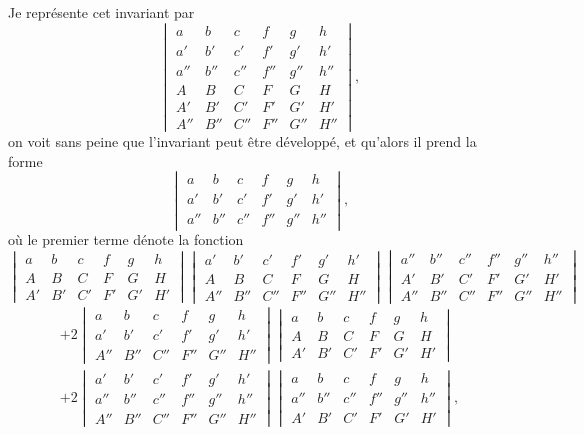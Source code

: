 \documentclass[11pt,a4paper]{article}
\theoremstyle{definition}
\begin{document}
Je repr\'{e}sente cet invariant par
\[
\begin{vmatrix}
a & b & c & f & g & h \\
a' & b' & c' & f' & g' & h' \\
a'' & b'' & c'' & f'' & g'' & h'' \\
A & B & C & F & G & H \\
A' & B' & C' & F' & G' & H' \\
A'' & B'' & C'' & F'' & G'' & H''
\end{vmatrix},
\]
\newpage
\noindent on voit sans peine que l'invariant peut \^{e}tre d\'{e}velopp\'{e}, et qu'alors il prend
la forme
\[
\begin{vmatrix}
a & b & c & f & g & h \\
a' & b' & c' & f' & g' & h' \\
a'' & b'' & c'' & f'' & g'' & h''
\end{vmatrix},
\]
o\`{u} le premier terme d\'{e}note la fonction
\[
\begin{vmatrix}
a & b & c & f & g & h \\
A & B & C & F & G & H \\
A' & B' & C' & F' & G' & H'
\end{vmatrix}
\begin{vmatrix}
a' & b' & c' & f' & g' & h' \\
A & B & C & F & G & H \\
A'' & B'' & C'' & F'' & G'' & H''
\end{vmatrix}
\begin{vmatrix}
a'' & b'' & c'' & f'' & g'' & h'' \\
A' & B' & C' & F' & G' & H' \\
A'' & B'' & C'' & F'' & G'' & H''
\end{vmatrix}
\]
\begin{multline*}
+ 2\begin{vmatrix}a & b & c & f & g & h \\ a' & b' & c' & f' & g' & h' \\ A'' & B'' & C'' & F'' & G'' & H''\end{vmatrix}
\begin{vmatrix}a & b & c & f & g & h \\ A & B & C & F & G & H \\ A' & B' & C' & F' & G' & H'\end{vmatrix} \\
+ 2\begin{vmatrix}a' & b' & c' & f' & g' & h' \\ a'' & b'' & c'' & f'' & g'' & h'' \\ A'' & B'' & C'' & F'' & G'' & H''\end{vmatrix}
\begin{vmatrix}a & b & c & f & g & h \\ a'' & b'' & c'' & f'' & g'' & h'' \\ A' & B' & C' & F' & G' & H'\end{vmatrix},
\end{multline*}
\end{document}
